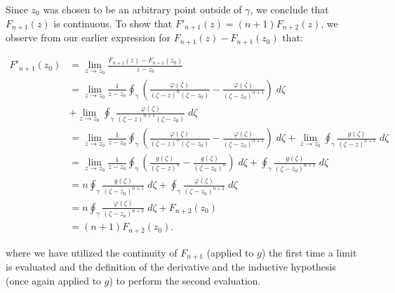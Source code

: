 \begin{solution}
    Since $z_0$ was chosen to be an arbitrary point outside of $\gamma$, we conclude that $F_{n+1}(z)$ is continuous. To
    show that $F'_{n+1}(z) = (n + 1) F_{n+2}(z)$, we observe from our earlier expression for $F_{n+1}(z) - F_{n+1}(z_0)$ 
    that:

    \begin{align*}
        F'_{n+1}(z_0) &= \lim_{z \to z_0} \frac{F_{n+1}(z) - F_{n+1}(z_0)}{z - z_0} \\
                    &= \lim_{z \to z_0} \frac{1}{z - z_0}\oint_{\gamma} {\left(\frac{\varphi(\zeta)}{(\zeta - z)^{n}(\zeta - z_0)} - \frac{\varphi(\zeta)}{(\zeta - z_0)^{n+1}} \right) \; d\zeta} \\
                    &+ \lim_{z \to z_0} \oint_{\gamma} {\frac{\varphi(\zeta)}{(\zeta - z)^{n+1}(\zeta - z_0)} \; d\zeta} \\
                    &= \lim_{z \to z_0} \frac{1}{z - z_0}\oint_{\gamma} {\left(\frac{\varphi(\zeta)}{(\zeta - z)^{n}(\zeta - z_0)} - \frac{\varphi(\zeta)}{(\zeta - z_0)^{n+1}} \right) \; d\zeta}
                    + \lim_{z \to z_0} \oint_{\gamma} {\frac{g(\zeta)}{(\zeta - z)^{n+1}} \; d\zeta} \\
                    &= \lim_{z \to z_0} \frac{1}{z - z_0}\oint_{\gamma} {\left(\frac{g(\zeta)}{(\zeta - z)^{n}} - \frac{g(\zeta)}{(\zeta - z_0)^n} \right) \; d\zeta}
                    + \oint_{\gamma} {\frac{g(\zeta)}{(\zeta - z_0)^{n+1}} \; d\zeta} \\
                    &= n \oint_{\gamma} {\frac{g(\zeta)}{(\zeta - z_0)^{n+1}} \; d\zeta}
                    + \oint_{\gamma} {\frac{\varphi(\zeta)}{(\zeta - z_0)^{n+2}} \; d\zeta} \\
                    &= n \oint_{\gamma} {\frac{\varphi(\zeta)}{(\zeta - z_0)^{n+2}} \; d\zeta} + F_{n+2}(z_0) \\
                    &= (n + 1) F_{n+2}(z_0).
    \end{align*}

    where we have utilized the continuity of $F_{n+1}$ (applied to $g$) the first time a limit is evaluated and the 
    definition of the derivative and the inductive hypothesis (once again applied to $g$) to perform the second 
    evaluation.
    \ \\
\end{solution}